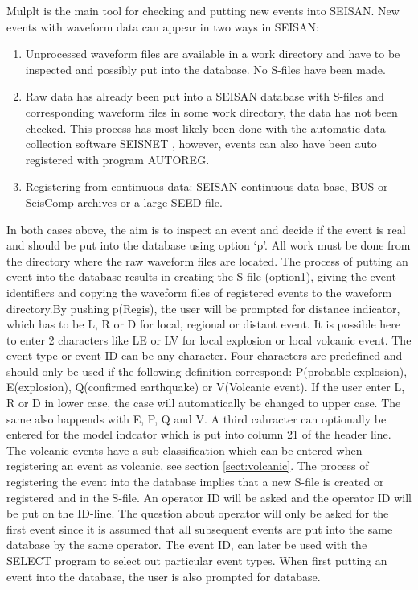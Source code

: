 Mulplt is the main tool for checking and putting new events into SEISAN. New events with waveform data can appear in two ways in SEISAN: 

\begin{enumerate}
\item
 Unprocessed waveform files are available in a work directory and have to be inspected and possibly put into the database. No S-files have been made. 
\item
 Raw data has already been put into a SEISAN database with S-files and corresponding waveform files in some work directory, the data has not been checked. This process has most likely been done with the automatic data collection software SEISNET \citep{ottemoller1999}, however, events can also have been auto registered with program AUTOREG.
\item 

Registering from continuous data: SEISAN continuous data base, BUS or SeisComp archives or a large SEED file.

\end{enumerate}

In both cases above, the aim is to inspect an event and decide if the event is real and should be put into the database using option `p'. All work must be done from the directory where the raw waveform files are located. The process of putting an event into the database results in creating the S-file (option1), giving the event identifiers and copying the waveform files of registered events to the waveform directory.By pushing p(Regis), the user will be prompted for distance indicator, which has to be L, R or D for local, regional or distant event. It is possible here to enter 2 characters like LE or LV for local explosion or local volcanic event. The event type or event ID can be any character. Four characters are predefined and should only be used if the following definition correspond: P(probable explosion), E(explosion), Q(confirmed earthquake) or V(Volcanic event). If the user enter L, R or D in lower case, the case will automatically be changed to upper case. The same also happends with E, P, Q and V. A third cahracter can optionally be entered for the model indcator   which is put into column 21 of the header line. The volcanic events have a sub classification which can be entered when registering an event as volcanic, see section \ref{sect:volcanic}. The process of registering the event into the database implies that a new S-file is created or registered and in the S-file. An operator ID will be asked and the operator ID will be put on the ID-line. The question about operator will only be asked for the first event since it is assumed that all subsequent events are put into the same database by the same operator. The event ID, can later be used with the SELECT program to select out particular event types. When first putting an event into the database, the user is also prompted for database.  

